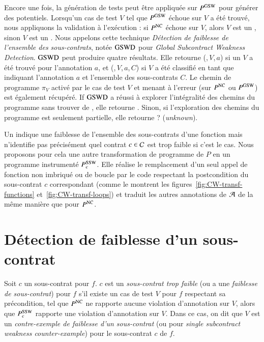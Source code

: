 Encore une fois, la génération de tests peut être appliquée sur $P^{\mathrm{GSW}}$ pour
générer des \GSWCE potentiels.
Lorsqu'un cas de test $V$ tel que $P^{\mathrm{GSW}}$ échoue sur $V$ a été trouvé, nous
appliquons la validation à l'exécution :
si $P^{\mathrm{NC}}$ échoue sur $V$, alors $V$ est un \NCCE, sinon $V$ est un \GSWCE.
Nous appelons cette technique
\emph{Détection de faiblesse de l'ensemble des sous-contrats}, notée $\mathrm{GSWD}$
pour \textit{Global Subcontract Weakness Detection}.
$\mathrm{GSWD}$ peut produire quatre résultats.
Elle retourne (\nc,\,$V$,\,$a$) si un \NCCE $V$ a été trouvé pour l'annotation
$a$, et (\cw,\,$V$,\,$a$,\,$C$) si $V$ a été classifié en tant que \SWCE
indiquant l'annotation $a$ et l'ensemble des sous-contrats $C$.
Le chemin de programme $\pi_V$ activé par le cas de test $V$ et menant à
l'erreur (sur $P^{\mathrm{NC}}$ ou $P^{\mathrm{GSW}}$) est également récupéré.
If $\mathrm{GSWD}$ a réussi à explorer l'intégralité des chemins du programme sans
trouver de \GSWCE, elle retourne \no.
Sinon, si l'exploration des chemins du programme est seulement partielle, elle
retourne \textsf{?} ({\em unknown}).

Un \GSWCE indique une faiblesse de l'ensemble des sous-contrats d'une fonction
mais n'identifie pas précisément quel contrat $c\in{\ensuremath\mathcal{C}}$ est trop faible si
c'est le cas.
Nous proposons pour cela une autre transformation de programme de $P$ en un
programme instrumenté $P_c^{\mathrm{SSW}}$.
Elle réalise le remplacement d'un seul appel de fonction non imbriqué ou de
boucle par le code respectant la postcondition du sous-contrat $c$ correspondant
(comme le montrent les figures~\ref{fig:CW-transf-functions}
et~\ref{fig:CW-transf-loops}) et traduit les autres annotations de ${\mathcal{A}}$ de la
même manière que pour $P^{\mathrm{NC}}$.


\section{Détection de faiblesse d'un sous-contrat}
\label{sec:swd-single}


\begin{definition} 
  \label{def:SSW}
  Soit $c$ un sous-contrat pour $f$.
  $c$ est un \emph{sous-contrat trop faible} (ou a une
  \emph{faiblesse de sous-contrat}) pour $f$ s'il existe un cas de test $V$ pour
   $f$ respectant sa précondition, tel que $P^{\mathrm{NC}}$ ne rapporte aucune violation
  d'annotation sur $V$, alors que $P_c^{\mathrm{SSW}}$ rapporte une violation
  d'annotation sur $V$.
  Dans ce cas, on dit que $V$ est un
  \emph{contre-exemple de faiblesse d'un sous-contrat} (ou \SSWCE pour
  \textit{single subcontract weakness counter-example}) pour le sous-contrat
  $c$ de $f$.
\end{definition}

